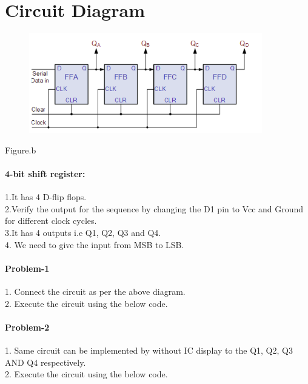 \documentclass[10pt, a4paper]{article}
\begin{document}
\section{Circuit Diagram}
\begin{figure}
\centering
    \includegraphics[width=4in]{SIPOregister.png}
\end{figure}
\begin{center}
Figure.b
 \end{center}
    \paragraph{4-bit shift register:}
 1.It has 4 D-flip flops.\\
 2.Verify the output for the sequence by changing the D1 pin to Vcc and Ground for different clock cycles.\\
 3.It has 4 outputs i.e Q1, Q2, Q3 and Q4.\\
 4. We need to give the input from MSB to LSB.\\
        
    \paragraph{Problem-1}
    1. Connect the circuit as per the above diagram.\\
    2. Execute the circuit using the below code.\\
	\paragraph{Problem-2}
1. Same circuit can be implemented by without IC display to the Q1, Q2, Q3 AND Q4 respectively.\\
2. Execute the circuit using the below code.\\
\end{document}
